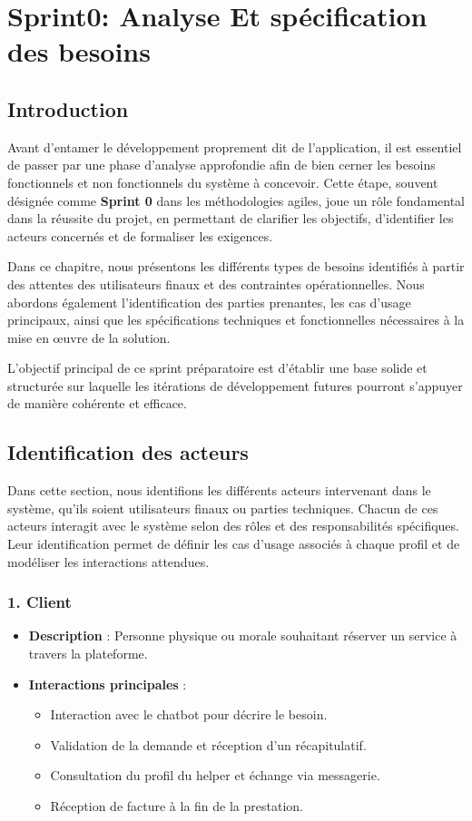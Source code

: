 \chapter{ Sprint0: Analyse Et  spécification des besoins}
\section*{Introduction}
Avant d'entamer le développement proprement dit de l'application, il est essentiel de passer par une phase d'analyse approfondie afin de bien cerner les besoins fonctionnels et non fonctionnels du système à concevoir. Cette étape, souvent désignée comme \textbf{Sprint 0} dans les méthodologies agiles, joue un rôle fondamental dans la réussite du projet, en permettant de clarifier les objectifs, d’identifier les acteurs concernés et de formaliser les exigences.

Dans ce chapitre, nous présentons les différents types de besoins identifiés à partir des attentes des utilisateurs finaux et des contraintes opérationnelles. Nous abordons également l’identification des parties prenantes, les cas d’usage principaux, ainsi que les spécifications techniques et fonctionnelles nécessaires à la mise en œuvre de la solution.

L'objectif principal de ce sprint préparatoire est d'établir une base solide et structurée sur laquelle les itérations de développement futures pourront s’appuyer de manière cohérente et efficace. \\

\section{Identification des acteurs }
Dans cette section, nous identifions les différents acteurs intervenant dans le système, qu’ils soient utilisateurs finaux ou parties techniques. Chacun de ces acteurs interagit avec le système selon des rôles et des responsabilités spécifiques. Leur identification permet de définir les cas d’usage associés à chaque profil et de modéliser les interactions attendues.
 \\

\subsection*{1. Client}
\begin{itemize}
  \item \textbf{Description} : Personne physique ou morale souhaitant réserver un service à travers la plateforme.
  \item \textbf{Interactions principales} :
    \begin{itemize}
        \item Interaction avec le chatbot pour décrire le besoin.
        \item Validation de la demande et réception d’un récapitulatif.
        \item Consultation du profil du helper et échange via messagerie.
        \item Réception de facture à la fin de la prestation.
    \end{itemize}
\end{itemize}


